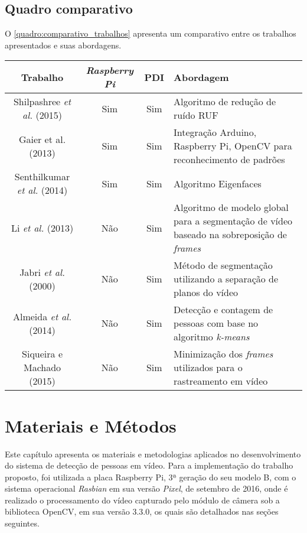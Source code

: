 \documentclass[12pt,oneside,a4paper,chapter=TITLE,section=TITLE,sumario=tradicional]{abntex2}
\begin{document}
\section{Quadro comparativo}

O \autoref{quadro:comparativo_trabalhos} apresenta um comparativo entre os trabalhos apresentados e suas abordagens.

\begin{quadro}[htb]
    \begin{tabular}{|c||c|c|p{4.5cm}|}
        \hline
        \textbf{Trabalho} & \textbf{\textit{Raspberry Pi}} & \textbf{PDI} & \textbf{Abordagem} \\ 
        \hline\hline
        Shilpashree \textit{et al.} (2015) & Sim    & Sim   & Algoritmo de redução de ruído RUF   \\ \hline
        Gaier et al. (2013)  & Sim    & Sim   & Integração Arduino, Raspberry Pi, OpenCV para reconhecimento de padrões    \\ \hline
        Senthilkumar \textit{et al.} (2014)   & Sim   & Sim  & Algoritmo Eigenfaces    \\ \hline
        Li \textit{et al.} (2013)  & Não    & Sim  & Algoritmo de modelo global para a segmentação de vídeo  baseado na sobreposição de \textit{frames}   \\ \hline
        Jabri \textit{et al.} (2000)  & Não    & Sim   & Método de segmentação utilizando a separação de planos do vídeo    \\ \hline
        Almeida \textit{et al.} (2014)  & Não    & Sim   & Detecção e contagem de pessoas com base no algoritmo \textit{k-means}    \\ \hline
        Siqueira e Machado (2015) & Não   & Sim  & Minimização dos \textit{frames} utilizados para o rastreamento em vídeo    \\ \hline
    \end{tabular}
    \fonteautor
\end{quadro}

\chapter{Materiais e Métodos}
\label{cap:metodologia}

Este capítulo apresenta os materiais e metodologias aplicados no desenvolvimento do sistema de detecção de pessoas em vídeo. Para a implementação do trabalho proposto, foi utilizada a placa Raspberry Pi, 3ª geração do seu modelo B, com o sistema operacional \textit{Rasbian} em sua versão \textit{Pixel}, de setembro de 2016, onde é realizado o processamento do vídeo capturado pelo módulo de câmera sob a biblioteca OpenCV, em sua versão 3.3.0, os quais são detalhados nas seções seguintes.
\end{document}
